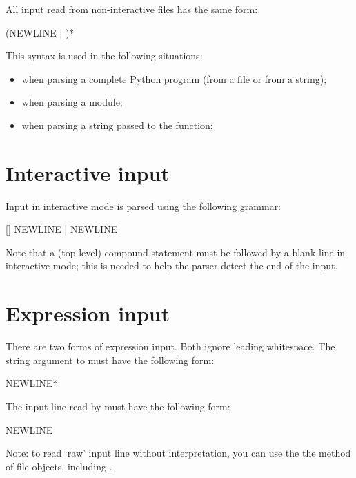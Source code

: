 All input read from non-interactive files has the same form:

\begin{productionlist}
             {(NEWLINE | )*}
\end{productionlist}

This syntax is used in the following situations:

\begin{itemize}

\item when parsing a complete Python program (from a file or from a string);

\item when parsing a module;

\item when parsing a string passed to the  function;

\end{itemize}


\section{Interactive input\label{interactive}}

Input in interactive mode is parsed using the following grammar:

\begin{productionlist}
             {[] NEWLINE |  NEWLINE}
\end{productionlist}

Note that a (top-level) compound statement must be followed by a blank
line in interactive mode; this is needed to help the parser detect the
end of the input.


\section{Expression input\label{expression-input}}

There are two forms of expression input.  Both ignore leading
whitespace.
The string argument to  must have the following form:

\begin{productionlist}
             { NEWLINE*}
\end{productionlist}

The input line read by  must have the following form:

\begin{productionlist}
             { NEWLINE}
\end{productionlist}

Note: to read `raw' input line without interpretation, you can use the
the  method of file objects, including .
